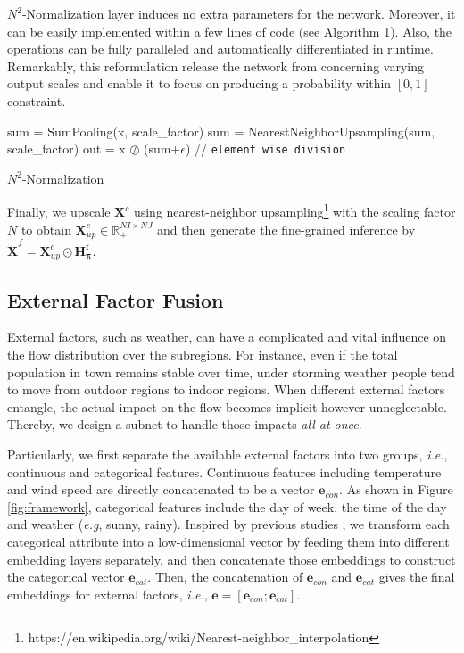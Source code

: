 $N^2$-Normalization layer induces no extra parameters for the network. Moreover, it can be easily implemented within a few lines of code (see Algorithm 1). Also, the operations can be fully paralleled and automatically differentiated in runtime. Remarkably, this reformulation release the network from concerning varying output scales and enable it to focus on producing a probability within $[0,1]$ constraint.
\begin{algorithm}[!t]
\SetAlgoLined
  \vspace{-0.5mm}
  \vspace{-0.5mm}
  \vspace{-0.5mm}
 \vspace{2mm}
 sum = SumPooling(x, scale\_factor)\;
 sum = NearestNeighborUpsampling(sum, scale\_factor)\;
 out \hspace{1mm}= x $\oslash$ (sum+$\epsilon$) // \texttt{element wise division} 
 \caption{$N^2$-Normalization}
 \label{alg:n2}
\end{algorithm}
 

Finally, we upscale $\mathbf{X}^c$ using nearest-neighbor upsampling\footnote{https://en.wikipedia.org/wiki/Nearest-neighbor\_interpolation} with the scaling factor $N$ to obtain $\mathbf{X}^c_{up}\in\mathbb{R}^{NI\times NJ}_{+}$ and then generate the fine-grained inference by $\tilde{\mathbf{X}}^f=\mathbf{X}^c_{up}\odot\mathbf{H^f_\pi}$.

\subsection{External Factor Fusion}
External factors, such as weather, can have a complicated and vital influence on the flow distribution over the subregions. For instance, even if the total population in town remains stable over time, under storming weather people tend to move from outdoor regions to indoor regions. When different external factors entangle, the actual impact on the flow becomes implicit however unneglectable. Thereby, we design a subnet to handle those impacts \textit{all at once}.

Particularly, we first separate the available external factors into two groups, \emph{i.e.}, continuous and categorical features. Continuous features including temperature and wind speed are directly concatenated to be a vector $\mathbf{e}_{con}$. As shown in Figure \ref{fig:framework}, categorical features include the day of week, the time of the day and weather (\emph{e.g}, sunny, rainy). Inspired by previous studies \cite{liang2018geoman}, we transform each categorical attribute into a low-dimensional vector by feeding them into different embedding layers separately, and then concatenate those embeddings to construct the categorical vector $\mathbf{e}_{cat}$. Then, the concatenation of $\mathbf{e}_{con}$ and $\mathbf{e}_{cat}$ gives the final embeddings for external factors, \emph{i.e.}, $\mathbf{e}=[\mathbf{e}_{con};\mathbf{e}_{cat}]$.

